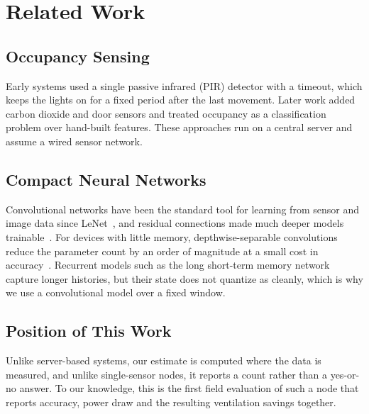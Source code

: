 \section{Related Work}\label{sec:related-work}
\subsection{Occupancy Sensing}
Early systems used a single passive infrared (PIR) detector with a timeout, which keeps the lights on for a fixed period after the last movement. Later work added carbon dioxide and door sensors and treated occupancy as a classification problem over hand-built features. These approaches run on a central server and assume a wired sensor network.

\subsection{Compact Neural Networks}
Convolutional networks have been the standard tool for learning from sensor and image data since LeNet~\cite{lecun1998gradient}, and residual connections made much deeper models trainable~\cite{he2016deep}. For devices with little memory, depthwise-separable convolutions reduce the parameter count by an order of magnitude at a small cost in accuracy~\cite{howard2017mobilenets}. Recurrent models such as the long short-term memory network~\cite{hochreiter1997long} capture longer histories, but their state does not quantize as cleanly, which is why we use a convolutional model over a fixed window.

\subsection{Position of This Work}
Unlike server-based systems, our estimate is computed where the data is measured, and unlike single-sensor nodes, it reports a count rather than a yes-or-no answer. To our knowledge, this is the first field evaluation of such a node that reports accuracy, power draw and the resulting ventilation savings together.
